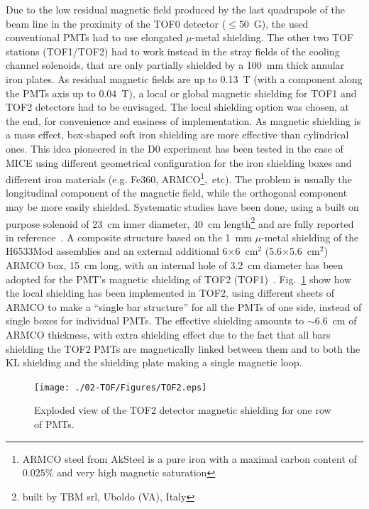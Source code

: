 Due to the low residual magnetic field produced by the last quadrupole
of the beam line in the proximity of the TOF0 detector ($\leq$50~G),
the used conventional PMTs had to use  elongated $\mu$-metal
shielding.
The other two TOF stations (TOF1/TOF2) had to work instead in the stray fields
of the cooling channel solenoids, that are only partially shielded by a 100~mm thick
annular iron plates. As residual magnetic fields are up to 0.13~T (with a
component along the PMTs axis up to 0.04~T), a local or global
magnetic shielding for TOF1 and TOF2 detectors had to be envisaged.
The local shielding option was chosen, at the end, for convenience and
easiness of implementation.
As magnetic shielding is a mass effect, box-shaped soft iron shielding
are more effective than cylindrical ones. This idea pioneered in the
D0 experiment has been tested in the case of MICE using different geometrical
configuration for the iron shielding boxes and different iron materials (e.g. Fe360, ARMCO\footnote{ARMCO steel from AkSteel is a pure iron with
a maximal carbon content of $0.025\%$ and very high magnetic saturation},~etc).
The problem is usually the longitudinal component of the magnetic field, while the orthogonal component may be more easily shielded.
Systematic studies have been done, using a built on purpose solenoid of 23~cm inner diameter,
40~cm length\footnote{built by TBM srl, Uboldo (VA), Italy} and are fully reported in reference~\cite{2012NIMPA.693..130B}.
A composite structure based on the 1~mm $\mu$-metal shielding
of the H6533Mod assemblies and an external
additional 6$\times$6~cm$^2$ (5.6$\times$5.6~cm$^2$) ARMCO box, 15~cm long, with an
internal hole of 3.2~cm diameter has been adopted for the PMT's magnetic
shielding of TOF2 (TOF1)~\cite{NOTE455}.
Fig.~\ref{fig:TOF1} show how the local shielding has been
implemented in TOF2, using different sheets of ARMCO to make a ``single bar structure''
for all the PMTs of one side, instead of single boxes for individual PMTs. The effective shielding amounts to $\sim$6.6~cm of ARMCO
thickness, with extra shielding effect due to the fact that all bars shielding
the TOF2 PMTs are magnetically linked between them and to both the KL shielding
and the shielding  plate making a single magnetic loop.
\begin{figure}
  \begin{center}
  \texttt{[image: ./02-TOF/Figures/TOF2.eps]} \\
  \caption{Exploded view of the TOF2 detector magnetic shielding for one row of PMTs.}
  \label{fig:TOF1}
  \end{center}
\end{figure}
